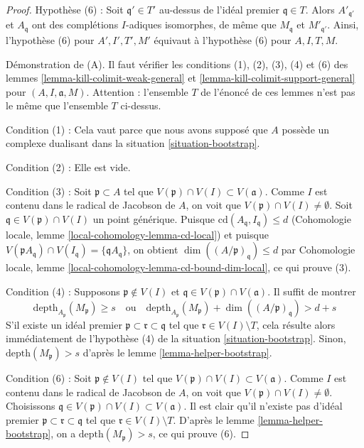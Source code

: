 \begin{proof}
\medskip\noindent
Hypothèse (6) : Soit $\mathfrak q' \in T'$ au-dessus de l'idéal
premier $\mathfrak q \in T$. Alors $A'_{\mathfrak q'}$
et $A_\mathfrak q$ ont des complétions $I$-adiques isomorphes,
de même que $M_\mathfrak q$ et $M'_{\mathfrak q'}$.
Ainsi, l'hypothèse (6) pour $A', I', T', M'$ équivaut
à l'hypothèse (6) pour $A, I, T, M$.

\medskip\noindent
Démonstration de (A). Il faut vérifier les conditions (1), (2), (3), (4) et (6)
des lemmes \ref{lemma-kill-colimit-weak-general} et
\ref{lemma-kill-colimit-support-general} pour
$(A, I, \mathfrak a, M)$. Attention : l'ensemble $T$ de l'énoncé de
ces lemmes n'est pas le même que l'ensemble $T$ ci-dessus.

\medskip\noindent
Condition (1) : Cela vaut parce que nous avons supposé que $A$ possède un complexe dualisant dans la
situation \ref{situation-bootstrap}.

\medskip\noindent
Condition (2) : Elle est vide.

\medskip\noindent
Condition (3) : Soit $\mathfrak p \subset A$ tel que
$V(\mathfrak p) \cap V(I) \subset V(\mathfrak a)$.
Comme $I$ est contenu dans le radical de Jacobson de $A$, on voit
que $V(\mathfrak p) \cap V(I) \not = \emptyset$.
Soit $\mathfrak q \in V(\mathfrak p) \cap V(I)$ un point générique.
Puisque $\text{cd}(A_\mathfrak q, I_\mathfrak q) \leq d$
(Cohomologie locale, lemme \ref{local-cohomology-lemma-cd-local}) et puisque
$V(\mathfrak p A_\mathfrak q) \cap V(I_\mathfrak q) =
\{\mathfrak q A_\mathfrak q\}$, on obtient
$\dim((A/\mathfrak p)_\mathfrak q) \leq d$ par Cohomologie locale,
lemme \ref{local-cohomology-lemma-cd-bound-dim-local}, ce qui prouve (3).

\medskip\noindent
Condition (4) : Supposons $\mathfrak p \not \in V(I)$ et
$\mathfrak q \in V(\mathfrak p) \cap V(\mathfrak a)$.
Il suffit de montrer
$$
\text{depth}_{A_\mathfrak p}(M_\mathfrak p) \geq s
\quad\text{ou}\quad
\text{depth}_{A_\mathfrak p}(M_\mathfrak p) +
\dim((A/\mathfrak p)_\mathfrak q) > d + s
$$
S'il existe un idéal premier $\mathfrak p \subset \mathfrak r \subset \mathfrak q$
tel que $\mathfrak r \in V(I) \setminus T$, cela résulte alors
immédiatement de l'hypothèse (4) de la situation \ref{situation-bootstrap}.
Sinon, $\text{depth}(M_\mathfrak p) > s$ d'après le
lemme \ref{lemma-helper-bootstrap}.

\medskip\noindent
Condition (6) : Soit $\mathfrak p \not \in V(I)$ tel que
$V(\mathfrak p) \cap V(I) \subset V(\mathfrak a)$.
Comme $I$ est contenu dans le radical de Jacobson de $A$, on voit
que $V(\mathfrak p) \cap V(I) \not = \emptyset$.
Choisissons $\mathfrak q \in V(\mathfrak p) \cap V(I) \subset V(\mathfrak a)$.
Il est clair qu'il n'existe pas d'idéal premier
$\mathfrak p \subset \mathfrak r \subset \mathfrak q$
tel que $\mathfrak r \in V(I) \setminus T$.
D'après le lemme \ref{lemma-helper-bootstrap}, on a
$\text{depth}(M_\mathfrak p) > s$, ce qui prouve (6).


\end{proof}

